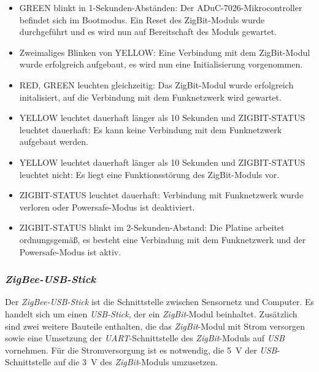 \begin{itemize}
    \item{GREEN blinkt in 1-Sekunden-Abständen:} Der ADuC-7026-Mikrocontroller befindet sich im Bootmodus. Ein Reset des
                                                    ZigBit-Moduls wurde durchgeführt und es wird nun auf Bereitschaft des Moduls
                                                    gewartet.
    \item{Zweimaliges Blinken von YELLOW:} Eine Verbindung mit dem ZigBit-Modul wurde erfolgreich aufgebaut, es wird nun eine 
                                           Initialisierung vorgenommen.
    \item{RED, GREEN leuchten gleichzeitig:} Das ZigBit-Modul wurde erfolgreich initalisiert, auf die Verbindung mit dem 
                                                Funknetzwerk wird gewartet.
    \item{YELLOW leuchtet dauerhaft länger als 10 Sekunden und
          ZIGBIT-STATUS leuchtet dauerhaft:} Es kann keine Verbindung mit dem Funknetzwerk aufgebaut werden.
    \item{YELLOW leuchtet dauerhaft länger als 10 Sekunden und ZIGBIT-STATUS leuchtet nicht:} Es liegt eine Funktionsstörung des
          ZigBit-Moduls vor.
    \item{ZIGBIT-STATUS leuchtet dauerhaft:} Verbindung mit Funknetzwerk wurde verloren oder Powersafe-Modus ist deaktiviert.
    \item{ZIGBIT-STATUS blinkt im 2-Sekunden-Abstand:} Die Platine arbeitet ordnungsgemäß, es besteht eine Verbindung mit dem
                                                        Funknetzwerk und der Powersafe-Modus ist aktiv.
\end{itemize}
                                                        
\subsubsection{\emph{ZigBee-USB-Stick}}

Der \emph{ZigBee-USB-Stick} ist die Schnittstelle zwischen Sensornetz und Computer. Es handelt sich um einen 
\emph{USB-Stick}, der ein \emph{ZigBit}-Modul beinhaltet. Zusätzlich sind zwei weitere Bauteile enthalten, die das 
\emph{ZigBit}-Modul mit Strom versorgen sowie eine Umsetzung der \emph{UART}-Schnittstelle des \emph{ZigBit}-Moduls 
auf \emph{USB} vornehmen. Für die Stromversorgung ist es notwendig, die 5~V der
\emph{USB}-Schnittstelle auf die 3~V des \emph{ZigBit}-Moduls umzusetzen.

